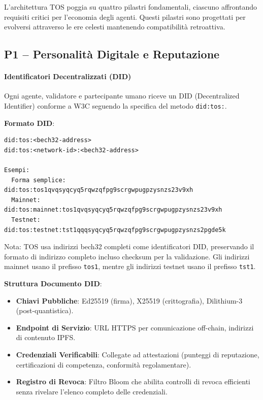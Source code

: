 \documentclass[11pt]{article}
\begin{document}
L'architettura TOS poggia su quattro pilastri fondamentali, ciascuno affrontando requisiti critici per l'economia degli agenti. Questi pilastri sono progettati per evolversi attraverso le ere celesti mantenendo compatibilità retroattiva.

\subsection{P1 -- Personalità Digitale e Reputazione}
\label{sec:pillar-identity}

\paragraph{Identificatori Decentralizzati (DID)}
Ogni agente, validatore e partecipante umano riceve un DID (Decentralized Identifier) conforme a W3C seguendo la specifica del metodo \texttt{did:tos:}.

\textbf{Formato DID}:
\begin{verbatim}
did:tos:<bech32-address>
did:tos:<network-id>:<bech32-address>

Esempi:
  Forma semplice:  did:tos:tos1qvqsyqcyq5rqwzqfpg9scrgwpugpzysnzs23v9xh
  Mainnet:         did:tos:mainnet:tos1qvqsyqcyq5rqwzqfpg9scrgwpugpzysnzs23v9xh
  Testnet:         did:tos:testnet:tst1qqqsyqcyq5rqwzqfpg9scrgwpugpzysnzs2pgde5k
\end{verbatim}
Nota: TOS usa indirizzi bech32 completi come identificatori DID, preservando il formato di indirizzo completo incluso checksum per la validazione. Gli indirizzi mainnet usano il prefisso \texttt{tos1}, mentre gli indirizzi testnet usano il prefisso \texttt{tst1}.

\textbf{Struttura Documento DID}:
\begin{itemize}[noitemsep]
  \item \textbf{Chiavi Pubbliche}: Ed25519 (firma), X25519 (crittografia), Dilithium-3 (post-quantistica).
  \item \textbf{Endpoint di Servizio}: URL HTTPS per comunicazione off-chain, indirizzi di contenuto IPFS.
  \item \textbf{Credenziali Verificabili}: Collegate ad attestazioni (punteggi di reputazione, certificazioni di competenza, conformità regolamentare).
  \item \textbf{Registro di Revoca}: Filtro Bloom che abilita controlli di revoca efficienti senza rivelare l'elenco completo delle credenziali.
\end{itemize}
\end{document}
